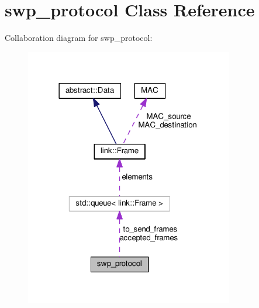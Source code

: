 \hypertarget{classswp__protocol}{}\section{swp\+\_\+protocol Class Reference}
\label{classswp__protocol}


Collaboration diagram for swp\+\_\+protocol\+:
\nopagebreak
\begin{figure}[H]
\begin{center}
\leavevmode
\includegraphics[width=258pt]{classswp__protocol__coll__graph}
\end{center}
\end{figure}
